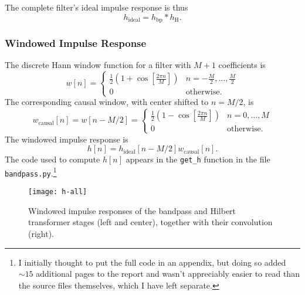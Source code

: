 The complete filter's ideal impulse response is thus
\begin{equation*}
    h_{\mathrm{ideal}} = h_{\mathrm{bp}} * h_{\mathrm{H}}.
\end{equation*}

\subsubsection{Windowed Impulse Response}

The discrete Hann window function for a filter with $ M + 1 $ coefficients is
\begin{equation*}%
    w[n] = 
    \begin{cases}
        \frac{1}{2} \left( 1 + \cos \left[ \frac{2\pi n}{M} \right] \right) & n = - \frac{M}{2}, \ldots, \frac{M}{2}\\
        0 & \text{otherwise}.
    \end{cases}
\end{equation*}
The corresponding causal window, with center shifted to $ n = M/2 $, is
\begin{equation*}
    w_{\mathrm{causal}}[n] = w[n - M/2] = 
    \begin{cases}
        \frac{1}{2} \left( 1 - \cos \left[ \frac{2\pi n}{M} \right] \right) & n = 0, \ldots, M\\
        0 & \text{otherwise}.
    \end{cases}
\end{equation*}
The windowed impulse response is
\begin{equation*}
    h[n] = h_{\mathrm{ideal}}[n - M/2] w_{\mathrm{causal}}[n].
\end{equation*}
The code used to compute $ h[n] $ appears in the \texttt{get\_h} function in the file \texttt{bandpass.py}.\footnote{I initially thought to put the full code in an appendix, but doing so added $ \sim 15 $ additional pages to the report and wasn't appreciably easier to read than the source files themselves, which I have left separate.}

\begin{figure}[htb!]
	\centering
	\texttt{[image: h-all]}
    \vspace{-3ex}
	\caption{Windowed impulse responses of the bandpass and Hilbert transformer stages (left and center), together with their convolution (right).}
	\label{fig:h-all}
\end{figure}

